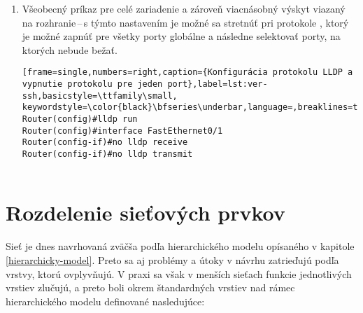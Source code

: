 \begin{enumerate}
\begin{minipage}{\linewidth}		
\begin{lstlisting}[frame=single,numbers=right,caption={Konfigurácia autentizácie OSPF na porte alebo v proccese},label=lst:ver-ssh,basicstyle=\ttfamily\small, keywordstyle=\color{black}\bfseries\underbar,language=,breaklines=true]
Router(config)#interface FastEthernet0/1
Router(config-if)#ip ospf message-digest-key 1 md5 heslo
Router(config-if)#ip ospf authentication message-digest

Router(config)#router ospf 1
Router(config)#area 0 authentication message-digest
Router(config)#area 0 authentication key-chain 1
\end{lstlisting}
\end{minipage}
	
	
	\item \vspace{2em} Všeobecný príkaz pre celé zariadenie a zároveň viacnásobný výskyt viazaný na rozhranie\,--\,s týmto nastavením je možné sa stretnúť pri protokole , ktorý je možné zapnúť pre všetky porty globálne a následne selektovať porty, na ktorých nebude bežať.
	
\begin{minipage}{\linewidth}		
\begin{lstlisting}[frame=single,numbers=right,caption={Konfigurácia protokolu LLDP a vypnutie protokolu pre jeden port},label=lst:ver-ssh,basicstyle=\ttfamily\small, keywordstyle=\color{black}\bfseries\underbar,language=,breaklines=true]
Router(config)#lldp run
Router(config)#interface FastEthernet0/1
Router(config-if)#no lldp receive
Router(config-if)#no lldp transmit
		

\end{lstlisting}
\end{minipage}
	
\end{enumerate}

\section{Rozdelenie sieťových prvkov}
Sieť je dnes navrhovaná zväčša podľa hierarchického modelu opísaného v kapitole \ref{hierarchicky-model}. Preto sa aj problémy a útoky v návrhu zatrieďujú podľa vrstvy, ktorú ovplyvňujú. V praxi sa však v menších sieťach funkcie jednotlivých vrstiev zlučujú, a preto boli okrem štandardných vrstiev nad rámec hierarchického modelu definované nasledujúce:

